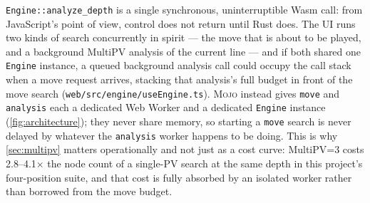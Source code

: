 \documentclass[10pt,twocolumn]{article}
\newcommand{\engine}{\textsc{Mojo}}
\newcommand{\code}[1]{\texttt{#1}}
\begin{document}
\code{Engine::analyze\_depth} is a single synchronous, uninterruptible Wasm
call: from JavaScript's point of view, control does not return until Rust
does.  The UI runs two kinds of search concurrently in spirit --- the move
that is about to be played, and a background MultiPV analysis of the current
line --- and if both shared one \code{Engine} instance, a queued background
analysis call could occupy the call stack when a move request arrives,
stacking that analysis's full budget in front of the move search
(\code{web/src/engine/useEngine.ts}).  \engine{} instead gives \code{move}
and \code{analysis} each a dedicated Web Worker and a dedicated \code{Engine}
instance (\cref{fig:architecture}); they never share memory, so starting a
\code{move} search is never delayed by whatever the \code{analysis} worker
happens to be doing.  This is why \cref{sec:multipv} matters operationally
and not just as a cost curve: MultiPV=3 costs 2.8--4.1$\times$ the node count
of a single-PV search at the same depth in this project's four-position
suite, and that cost is fully absorbed by an isolated worker rather than
borrowed from the move budget.
\end{document}
